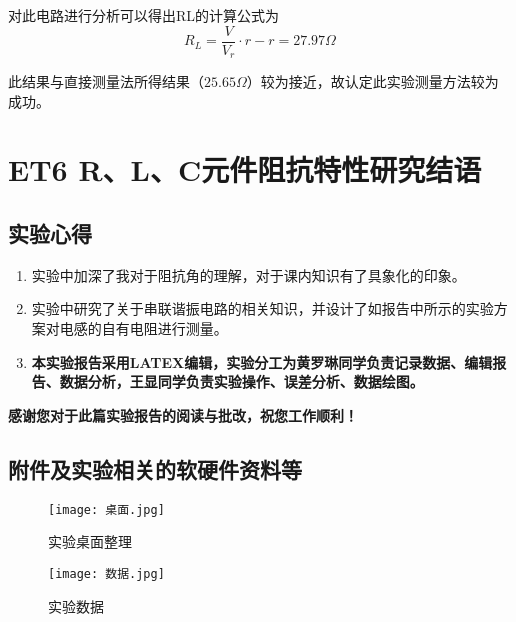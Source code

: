 \documentclass[dvipsnames, svgnames,a4paper,11pt]{article}
\begin{document}
	对此电路进行分析可以得出RL的计算公式为
	$$R_{L}=\frac{V}{V_{r}}\cdot r-r=27.97\Omega$$

	此结果与直接测量法所得结果（$25.65\Omega$）较为接近，故认定此实验测量方法较为成功。
	
	\clearpage
	
	\section{ET6 R、L、C元件阻抗特性研究\quad\heiti 结语}
	
	\subsection{实验心得}
	\begin{enumerate}
		\item 实验中加深了我对于阻抗角的理解，对于课内知识有了具象化的印象。
		\item 实验中研究了关于串联谐振电路的相关知识，并设计了如报告中所示的实验方案对电感的自有电阻进行测量。
	\item \textbf{本实验报告采用LATEX编辑，实验分工为黄罗琳同学负责记录数据、编辑报告、数据分析，王显同学负责实验操作、误差分析、数据绘图。}
	\end{enumerate}
	\quad \large \textbf{感谢您对于此篇实验报告的阅读与批改，祝您工作顺利！}
	

	\subsection{附件及实验相关的软硬件资料等}
	
	\begin{figure}[H]
		\centering
		\begin{minipage}[t]{0.45\textwidth}
			\centering
			\texttt{[image: 桌面.jpg]}
			\caption{实验桌面整理}
		\end{minipage}
		\hfill %
		\begin{minipage}[t]{0.45\textwidth}
			\centering
			\texttt{[image: 数据.jpg]}
			\caption{实验数据}
		\end{minipage}
	\end{figure}

	
	
\end{document}
